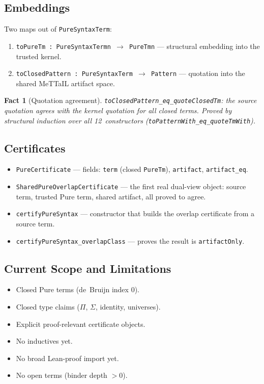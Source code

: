 \documentclass[11pt]{article}
\newtheorem{fact}[theorem]{Fact}
\theoremstyle{remark}
\newcommand{\MeTTaIL}{\textup{MeTTaIL}}
\newcommand{\code}[1]{\texttt{#1}}
\newcommand{\leanref}[1]{\texttt{#1}}
\begin{document}
\subsection{Embeddings}

Two maps out of \leanref{PureSyntaxTerm}:

\begin{enumerate}
  \item \leanref{toPureTm : PureSyntaxTerm\;n $\to$ PureTm\;n} ---
  structural embedding into the trusted kernel.
  \item \leanref{toClosedPattern : PureSyntaxTerm $\to$ Pattern} ---
  quotation into the shared \MeTTaIL{} artifact space.
\end{enumerate}

\begin{fact}[Quotation agreement]
\leanref{toClosedPattern\_eq\_quoteClosedTm}:
the source quotation agrees with the kernel quotation for all closed terms.
Proved by structural induction over all 12~constructors
(\leanref{toPatternWith\_eq\_quoteTmWith}).
\end{fact}

\subsection{Certificates}

\begin{itemize}
  \item \leanref{PureCertificate} --- fields: \code{term} (closed
  \leanref{PureTm}), \code{artifact}, \code{artifact\_eq}.
  \item \leanref{SharedPureOverlapCertificate} --- the first real
  dual-view object: source term, trusted Pure term, shared artifact,
  all proved to agree.
  \item \leanref{certifyPureSyntax} --- constructor that builds the
  overlap certificate from a source term.
  \item \leanref{certifyPureSyntax\_overlapClass} --- proves the
  result is \code{artifactOnly}.
\end{itemize}

\subsection{Current Scope and Limitations}

\begin{itemize}
  \item[\checkmark] Closed Pure terms (de~Bruijn index 0).
  \item[\checkmark] Closed type claims ($\Pi$, $\Sigma$, identity, universes).
  \item[\checkmark] Explicit proof-relevant certificate objects.
  \item[$\times$] No inductives yet.
  \item[$\times$] No broad Lean-proof import yet.
  \item[$\times$] No open terms (binder depth $> 0$).
\end{itemize}
\end{document}
